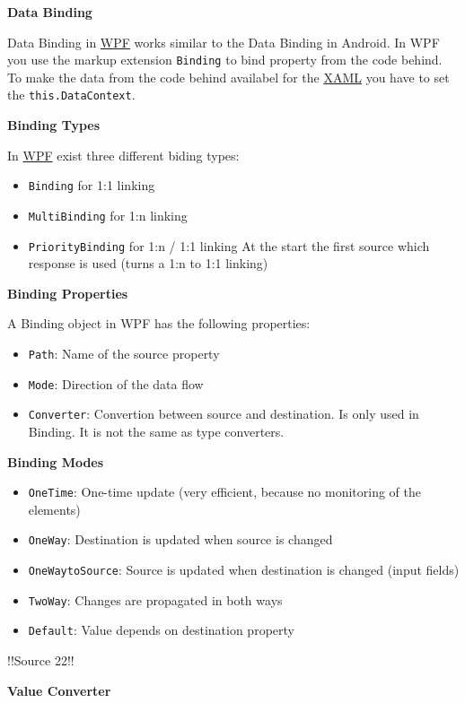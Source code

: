 \documentclass[10pt,twoside,landscape]{article}
\begin{document}
\begin{multicols}{3}
\textbf{Data Binding}

Data Binding in \href{../../../roam/20211123162923-wpf.org}{WPF} works similar to the Data Binding in Android.
In WPF you use the markup extension \texttt{Binding} to bind property from the code behind.
To make the data from the code behind availabel for the \href{../../../roam/20211123162058-xaml.org}{XAML} you have to set the \texttt{this.DataContext}.

\textbf{Binding Types}

In \href{../../../roam/20211123162923-wpf.org}{WPF} exist three different biding types:
\begin{itemize}
\item \texttt{Binding} for 1:1 linking
\item \texttt{MultiBinding} for 1:n linking
\item \texttt{PriorityBinding} for 1:n / 1:1 linking
At the start the first source which response is used (turns a 1:n to 1:1 linking)
\end{itemize}

\textbf{Binding Properties}

A Binding object in WPF has the following properties:
\begin{itemize}
\item \texttt{Path}: Name of the source property
\item \texttt{Mode}: Direction of the data flow
\item \texttt{Converter}: Convertion between source and destination.
Is only used in Binding.
It is not the same as type converters.
\end{itemize}

\textbf{Binding Modes}

\begin{itemize}
\item \texttt{OneTime}: One-time update (very efficient, because no monitoring of the elements)
\item \texttt{OneWay}: Destination is updated when source is changed
\item \texttt{OneWaytoSource}: Source is updated when destination is changed (input fields)
\item \texttt{TwoWay}: Changes are propagated in both ways
\item \texttt{Default}: Value depends on destination property
\end{itemize}

!!Source 22!!

\textbf{Value Converter}


\end{multicols}
\end{document}
